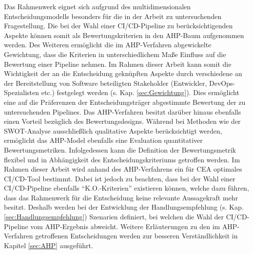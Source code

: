 Das Rahmenwerk eignet sich aufgrund des multidimensionalen Entscheidungsmodells besonders für die in der Arbeit zu untersuchenden Fragestellung. Die bei der Wahl einer CI/CD-Pipeline zu berücksichtigenden Aspekte können somit als Bewertungskriterien in den AHP-Baum aufgenommen werden. Des Weiteren ermöglicht die im AHP-Verfahren abgewickelte Gewichtung, dass die Kriterien in unterschiedlichem Maße Einfluss auf die Bewertung einer Pipeline nehmen. Im Rahmen dieser Arbeit kann somit die Wichtigkeit der an die Entscheidung geknüpften Aspekte durch verschiedene an der Bereitstellung von Software beteiligten Stakeholder (Entwickler, DevOps-Spezialisten etc.) festgelegt werden (s. Kap. \ref{sec:Gewichtung}). Dies ermöglicht eine auf die Präferenzen der Entscheidungsträger abgestimmte Bewertung der zu untersuchenden Pipelines. Das AHP-Verfahren besitzt darüber hinaus ebenfalls einen Vorteil bezüglich des Bewertungsdesigns. Während bei Methoden wie der SWOT-Analyse ausschließlich qualitative Aspekte berücksichtigt werden, ermöglicht das AHP-Model ebenfalls eine Evaluation quantitativer Bewertungsmetriken. Infolgedessen kann die Definition der Bewertungsmetrik flexibel und in Abhängigkeit des Entscheidungskriteriums getroffen werden. Im Rahmen dieser Arbeit wird anhand des AHP-Verfahrens ein für CEA optimales CI/CD-Tool bestimmt. Dabei ist jedoch zu beachten, dass bei der Wahl einer CI/CD-Pipeline ebenfalls \enquote{K.O.-Kriterien} existieren können, welche dazu führen, dass das Rahmenwerk für die Entscheidung keine relevante Aussagekraft mehr besitzt. Deshalb werden bei der Entwicklung der Handlungsempfehlung (s. Kap. \ref{sec:Handlungsempfehlung}) Szenarien definiert, bei welchen die Wahl der CI/CD-Pipeline vom AHP-Ergebnis abweicht. Weitere Erläuterungen zu den im AHP-Verfahren getroffenen Entscheidungen werden zur besseren Verständlichkeit in Kapitel \ref{sec:AHP} ausgeführt. 